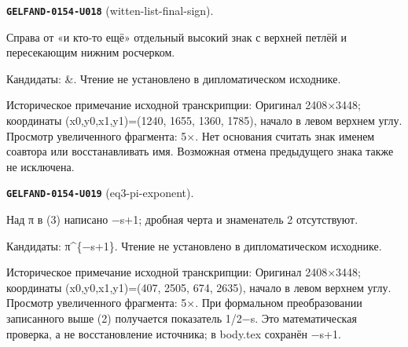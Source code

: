 \par\noindent\leavevmode{}\label{GELFAND-0154-U018}\textbf{\texttt{GELFAND-0154-U018}} (witten-list-final-sign).\nopagebreak[4]\par
Справа от «и кто-то ещё» отдельный высокий знак с верхней петлёй и пересекающим нижним росчерком.\par
Кандидаты: \&. Чтение не установлено в дипломатическом исходнике.\par
Историческое примечание исходной транскрипции: Оригинал 2408×3448; координаты (x0,y0,x1,y1)=(1240, 1655, 1360, 1785), начало в левом верхнем углу. Просмотр увеличенного фрагмента: 5×. Нет основания считать знак именем соавтора или восстанавливать имя. Возможная отмена предыдущего знака также не исключена.\par\medskip
\par\noindent\leavevmode{}\label{GELFAND-0154-U019}\textbf{\texttt{GELFAND-0154-U019}} (eq3-pi-exponent).\nopagebreak[4]\par
Над π в (3) написано −s+1; дробная черта и знаменатель 2 отсутствуют.\par
Кандидаты: π\textasciicircum{}\{−s+1\}. Чтение не установлено в дипломатическом исходнике.\par
Историческое примечание исходной транскрипции: Оригинал 2408×3448; координаты (x0,y0,x1,y1)=(407, 2505, 674, 2635), начало в левом верхнем углу. Просмотр увеличенного фрагмента: 5×. При формальном преобразовании записанного выше (2) получается показатель 1/2−s. Это математическая проверка, а не восстановление источника; в body.tex сохранён −s+1.\par\medskip

